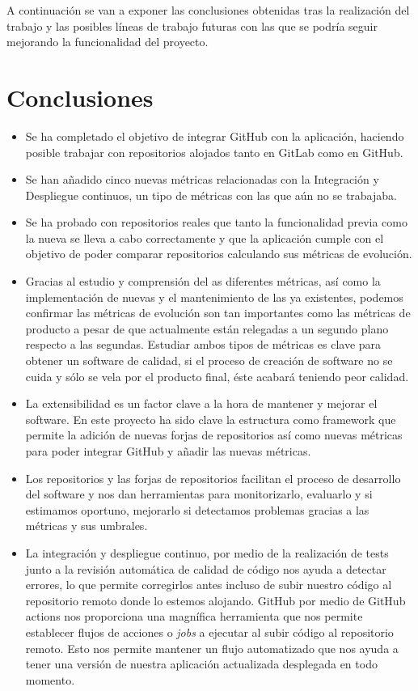 
A continuación se van a exponer las conclusiones obtenidas tras la realización del trabajo y las posibles líneas de trabajo futuras con las que se podría seguir mejorando la funcionalidad del proyecto.

\section{Conclusiones}

\begin{itemize}
	\item Se ha completado el objetivo de integrar GitHub con la aplicación, haciendo posible trabajar con repositorios alojados tanto en GitLab como en GitHub.
	\item Se han añadido cinco nuevas métricas relacionadas con la Integración y Despliegue continuos, un tipo de métricas con las que aún no se trabajaba.
	\item Se ha probado con repositorios reales que tanto la funcionalidad previa como la nueva se lleva a cabo correctamente y que la aplicación cumple con el objetivo de poder comparar repositorios calculando sus métricas de evolución.
	\item Gracias al estudio y comprensión del as diferentes métricas, así como la implementación de nuevas y el mantenimiento de las ya existentes, podemos confirmar las métricas de evolución son tan importantes como las métricas de producto a pesar de que actualmente están relegadas a un segundo plano respecto a las segundas. Estudiar ambos tipos de métricas es clave para obtener un software de calidad, si el proceso de creación de software no se cuida y sólo se vela por el producto final, éste acabará teniendo peor calidad. 
	\item La extensibilidad es un factor clave a la hora de mantener y mejorar el software. En este proyecto ha sido clave la estructura como framework que permite la adición de nuevas forjas de repositorios así como nuevas métricas para poder integrar GitHub y añadir las nuevas métricas.
	\item Los repositorios y las forjas de repositorios facilitan el proceso de desarrollo del software y nos dan herramientas para monitorizarlo, evaluarlo y si estimamos oportuno, mejorarlo si detectamos problemas gracias a las métricas y sus umbrales.
	\item La integración y despliegue continuo, por medio de la realización de tests junto a la revisión automática de calidad de código nos ayuda a detectar errores, lo que permite corregirlos antes incluso de subir nuestro código al repositorio remoto donde lo estemos alojando. GitHub por medio de GitHub actions nos proporciona una magnífica herramienta que nos permite establecer flujos de acciones o \textit{jobs} a ejecutar al subir código al repositorio remoto. Esto nos permite mantener un flujo automatizado que nos ayuda a tener una versión de nuestra aplicación actualizada desplegada en todo momento. 

\end{itemize}
